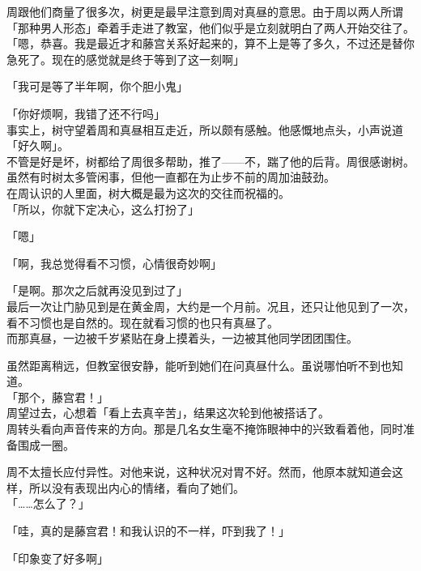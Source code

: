 周跟他们商量了很多次，树更是最早注意到周对真昼的意思。由于周以两人所谓「那种男人形态」牵着手走进了教室，他们似乎是立刻就明白了两人开始交往了。\\

「嗯，恭喜。我是最近才和藤宫关系好起来的，算不上是等了多久，不过还是替你急死了。现在的感觉就是终于等到了这一刻啊」

「我可是等了半年啊，你个胆小鬼」

「你好烦啊，我错了还不行吗」\\

事实上，树守望着周和真昼相互走近，所以颇有感触。他感慨地点头，小声说道「好久啊」。\\

不管是好是坏，树都给了周很多帮助，推了——不，踹了他的后背。周很感谢树。虽然有时树太多管闲事，但他一直都在为止步不前的周加油鼓劲。\\

在周认识的人里面，树大概是最为这次的交往而祝福的。\\

「所以，你就下定决心，这么打扮了」

「嗯」

「啊，我总觉得看不习惯，心情很奇妙啊」

「是啊。那次之后就再没见到过了」\\

最后一次让门胁见到是在黄金周，大约是一个月前。况且，还只让他见到了一次，看不习惯也是自然的。现在就看习惯的也只有真昼了。\\

而那真昼，一边被千岁紧贴在身上摸着头，一边被其他同学团团围住。

虽然距离稍远，但教室很安静，能听到她们在问真昼什么。虽说哪怕听不到也知道。\\

「那个，藤宫君！」\\

周望过去，心想着「看上去真辛苦」，结果这次轮到他被搭话了。\\

周转头看向声音传来的方向。那是几名女生毫不掩饰眼神中的兴致看着他，同时准备围成一圈。

周不太擅长应付异性。对他来说，这种状况对胃不好。然而，他原本就知道会这样，所以没有表现出内心的情绪，看向了她们。\\

「……怎么了？」

「哇，真的是藤宫君！和我认识的不一样，吓到我了！」

「印象变了好多啊」

